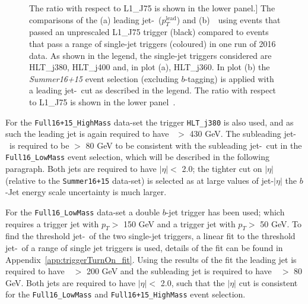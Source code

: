 \begin{figure}[!ht]
            The ratio with respect to L1\_J75 is shown in the lower panel.]
          {The comparisons of the (a) leading jet-\pT~($p_T^{\text{lead}}$) and (b)~\mjj~using events that passed an
            unprescaled L1\_J75 trigger (black) compared to events that pass a range of single-jet triggers (coloured) in one run of 2016 data.
            As shown in the legend, the single-jet triggers considered are HLT\_j380, HLT\_j400 and, in plot (a), HLT\_j360.
            In plot (b) the \textit{Summer16+15} event selection (excluding $b$-tagging) is applied with a leading jet-\pT~cut as described in the legend.
            The ratio with respect to L1\_J75 is shown in the lower panel~\cite{dibjet-ichep_conf}.}
     \label{fig:evt-ICHEP_turnon}
\end{figure}

For the \verb|Full16+15_HighMass| data-set the trigger \verb|HLT_j380| is also used,
and as such the leading jet is again required to have \pT~$>$ 430 GeV.
The subleading jet-\pT~is required to be $>$ 80 GeV to be consistent with the subleading jet-\pT~cut in the \verb|Full16_LowMass| event selection,
which will be described in the following paragraph.
Both jets  are required to have $|\eta| <$ 2.0;
the tighter cut on $|\eta|$ (relative to the \verb|Summer16+15| data-set) is selected
as at large values of jet-$|\eta|$ the $b$-Jet energy scale uncertainty is much larger.

For the \verb|Full16_LowMass| data-set a double $b$-jet trigger has been used;
which requires a trigger jet with $p_T >$ 150 GeV and a trigger jet with $p_T >$ 50 GeV.
To find the threshold jet-\pT~of the two single-jet triggers,
a linear fit to the threshold jet-\pT~of a range of single jet triggers is used,
details of the fit can be found in Appendix~\ref{app:triggerTurnOn_fit}.
Using the results of the fit the leading jet is required to have~\pT~$>$ 200 GeV
and the subleading jet is required to have~\pT~$>$ 80 GeV.
Both jets  are required to have $|\eta| <$ 2.0,
such that the $|\eta|$ cut is consistent for the \verb|Full16_LowMass| and \verb|Full16+15_HighMass| event selection.


